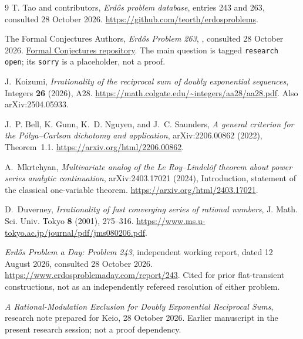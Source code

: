 \documentclass[11pt,a4paper]{article}
\theoremstyle{remark}\newtheorem{remark}[theorem]{Remark}
\begin{document}
\begin{thebibliography}{9}
\small
{}
T. Tao and contributors, \emph{Erd\H{o}s problem database},
entries 243 and 263, consulted 28 October 2026.
\url{https://github.com/teorth/erdosproblems}.

The Formal Conjectures Authors, \emph{Erd\H{o}s Problem 263},
, consulted 28 October 2026.
\href{https://github.com/google-deepmind/formal-conjectures/blob/main/FormalConjectures/ErdosProblems/263.lean}{Formal Conjectures repository}.
The main question is tagged \texttt{research open}; its \texttt{sorry}
is a placeholder, not a proof.

J.~Koizumi, \emph{Irrationality of the reciprocal sum of doubly exponential
sequences}, Integers \textbf{26} (2026), A28.
\url{https://math.colgate.edu/~integers/aa28/aa28.pdf}.
Also arXiv:2504.05933.

J.~P. Bell, K. Gunn, K.~D. Nguyen, and J.~C. Saunders,
\emph{A general criterion for the P\'olya--Carlson dichotomy and application},
arXiv:2206.00862 (2022), Theorem~1.1.
\url{https://arxiv.org/html/2206.00862}.

A.~Mkrtchyan, \emph{Multivariate analog of the Le Roy--Lindel\"of theorem
about power series analytic continuation}, arXiv:2403.17021 (2024),
Introduction, statement of the classical one-variable theorem.
\url{https://arxiv.org/html/2403.17021}.

D.~Duverney, \emph{Irrationality of fast converging series of rational
numbers}, J. Math. Sci. Univ. Tokyo \textbf{8} (2001), 275--316.
\url{https://www.ms.u-tokyo.ac.jp/journal/pdf/jms080206.pdf}.

\emph{Erd\H{o}s Problem a Day: Problem 243}, independent working report,
dated 12 August 2026, consulted 28 October 2026.
\url{https://www.erdosproblemaday.com/report/243}.
Cited for prior flat-transient constructions, not as an independently
refereed resolution of either problem.

\emph{A Rational-Modulation Exclusion for Doubly Exponential Reciprocal
Sums}, research note prepared for Keio, 28 October 2026.
Earlier manuscript in the present research session; not a proof dependency.
\end{thebibliography}
\end{document}
